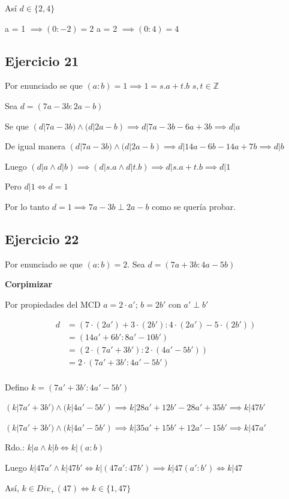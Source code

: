 Así $ d \in \{ 2,4 \}$

a = 1 $ \implies (0:-2) = 2 $
a = 2 $ \implies (0:4) = 4 $

\subsection{Ejercicio 21}
Por enunciado se que $ (a:b) = 1 \implies 1 = s.a + t.b$  $s,t \in \mathbb{Z}$

Sea $ d = (7a-3b:2a-b) $

Se que $ (d| 7a-3b) \wedge (d|2a-b) \implies d|7a-3b-6a+3b \implies d|a $

De igual manera $ (d| 7a-3b) \wedge (d|2a-b) \implies d|14a-6b-14a+7b \implies d|b $

Luego $ (d|a \wedge d|b) \implies (d|s.a \wedge d|t.b) \implies d|s.a + t.b \implies d|1$

Pero $ d|1 \iff d=1 $

Por lo tanto $ d=1 \implies 7a-3b \perp 2a-b $ como se quería probar.

\subsection{Ejercicio 22}
Por enunciado se que $ (a:b) = 2 $. Sea $ d = (7a+3b:4a-5b) $

\textbf{Corpimizar}

Por propiedades del MCD $ a = 2\cdot a' $; $ b = 2b' $ con $ a' \perp b' $

\begin{align*}
    d &= (7\cdot (2a') + 3\cdot(2b'):4 \cdot (2a')-5\cdot (2b')) \\
    &= (14a' + 6b':8a' - 10b') \\
    &= (2\cdot (7a' + 3b'):2\cdot (4a' - 5b')) \\
    &= 2 \cdot (7a' + 3b':4a' - 5b') \\
\end{align*}

Defino $ k = (7a' + 3b':4a' - 5b') $

$ (k|7a' + 3b') \wedge (k|4a' - 5b') \implies k|28a' + 12b' -28a' +35b' \implies k|47b' $

$ (k|7a' + 3b') \wedge (k|4a' - 5b') \implies k|35a'+15b'+12a'-15b' \implies k|47a' $

Rdo.: $ k|a \wedge k|b \iff k|(a:b)$

Luego $ k|47a' \wedge k|47b' \iff k|(47a':47b') \implies k|47(a':b') \iff k|47 $

Así, $ k \in Div_+(47) \iff k\in \{ 1,47 \} $

